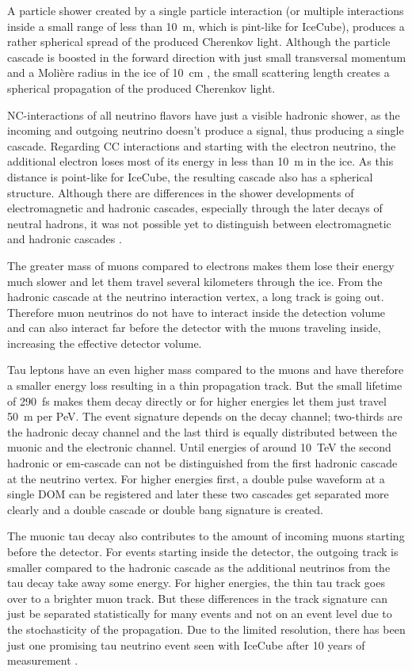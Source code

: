 A particle shower created by a single particle interaction (or multiple interactions inside a small range of less than \SI{10}{m}, which is pint-like for IceCube), produces a rather spherical spread of the produced Cherenkov light.
Although the particle cascade is boosted in the forward direction with just small transversal momentum and a Moli\`{e}re radius in the ice of \SI{10}{cm} \cite{PDG20}, the small scattering length creates a spherical propagation of the produced Cherenkov light.

NC-interactions of all neutrino flavors have just a visible hadronic shower, as the incoming and outgoing neutrino doesn't produce a signal, thus producing a single cascade.
Regarding CC interactions and starting with the electron neutrino, the additional electron loses most of its energy in less than \SI{10}{m} in the ice.
As this distance is point-like for IceCube, the resulting cascade also has a spherical structure.
Although there are differences in the shower developments of electromagnetic and hadronic cascades, especially through the later decays of neutral hadrons, it was not possible yet to distinguish between electromagnetic and hadronic cascades \cite{Steuer17ICRC}.

The greater mass of muons compared to electrons makes them lose their energy much slower and let them travel several kilometers through the ice.
From the hadronic cascade at the neutrino interaction vertex, a long track is going out.
Therefore muon neutrinos do not have to interact inside the detection volume and can also interact far before the detector with the muons traveling inside, increasing the effective detector volume.

Tau leptons have an even higher mass compared to the muons and have therefore a smaller energy loss resulting in a thin propagation track.
But the small lifetime of \SI{290}{fs} makes them decay directly or for higher energies let them just travel \SI{50}{m} per PeV.
The event signature depends on the decay channel; two-thirds are the hadronic decay channel and the last third is equally distributed between the muonic and the electronic channel.
Until energies of around \SI{10}{TeV} the second hadronic or em-cascade can not be distinguished from the first hadronic cascade at the neutrino vertex.
For higher energies first, a double pulse waveform at a single DOM can be registered and later these two cascades get separated more clearly and a double cascade or double bang signature is created.

The muonic tau decay also contributes to the amount of incoming muons starting before the detector.
For events starting inside the detector, the outgoing track is smaller compared to the hadronic cascade as the additional neutrinos from the tau decay take away some energy.
For higher energies, the thin tau track goes over to a brighter muon track.
But these differences in the track signature can just be separated statistically for many events and not on an event level due to the stochasticity of the propagation.
Due to the limited resolution, there has been just one promising tau neutrino event seen with IceCube after 10 years of measurement \cite{Meier19ICRC, IceCube20HeseTau}.

